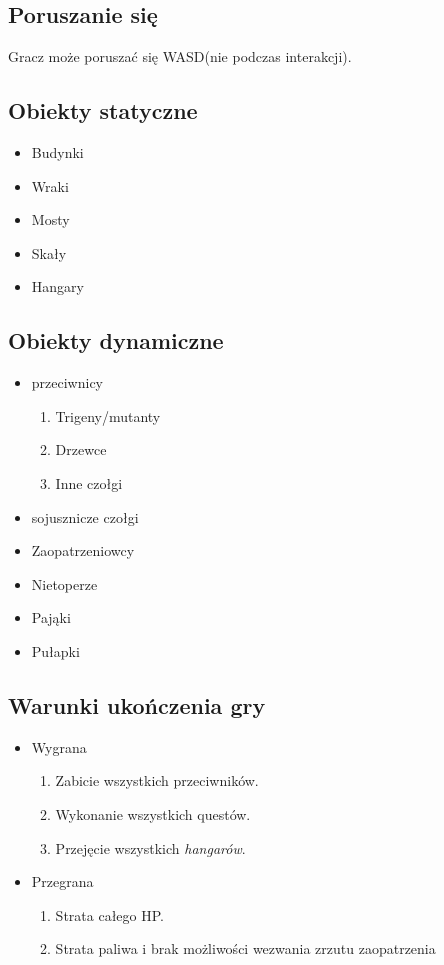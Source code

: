 \documentclass{article}
\begin{document}
    \subsection{Poruszanie się}
    Gracz może poruszać się WASD(nie podczas interakcji).
    \subsection{Obiekty statyczne}
    \begin{itemize}
        \item Budynki
        \item Wraki
        \item Mosty
        \item Skały
        \item Hangary
        
    \end{itemize}
    \subsection{Obiekty dynamiczne}
    \begin{itemize}
        \item przeciwnicy
        \begin{enumerate}
            \item Trigeny/mutanty
            \item Drzewce
            \item Inne czołgi
        \end{enumerate}
        \item sojusznicze czołgi
        \item Zaopatrzeniowcy
        \item Nietoperze
        \item Pająki
        \item Pułapki
        
    \end{itemize}
    \subsection{Warunki ukończenia gry}
\begin{itemize}
    \item Wygrana
    \begin{enumerate}
        \item Zabicie wszystkich przeciwników.
        \item Wykonanie wszystkich questów.
        \item Przejęcie wszystkich \emph{hangarów}.
    \end{enumerate}
    \item Przegrana
    \begin{enumerate}
        \item Strata całego HP.
        \item Strata paliwa i brak możliwości wezwania zrzutu zaopatrzenia
    \end{enumerate}
\end{itemize}
    
\end{document}
